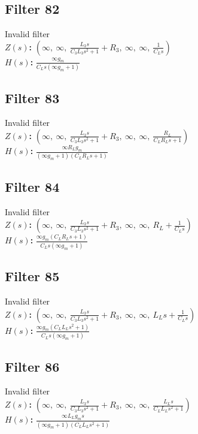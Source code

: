 \documentclass{article}
\begin{document}
\subsection*{Filter 82}
Invalid filter \\ 
\textbf{$Z(s)$:} $\left( \infty, \  \infty, \  \frac{L_{3} s}{C_{3} L_{3} s^{2} + 1} + R_{3}, \  \infty, \  \infty, \  \frac{1}{C_{L} s}\right)$ \\ 
\textbf{$H(s)$:} $\frac{\infty g_{m}}{C_{L} s \left(\infty g_{m} + 1\right)}$ \\ 
\subsection*{Filter 83}
Invalid filter \\ 
\textbf{$Z(s)$:} $\left( \infty, \  \infty, \  \frac{L_{3} s}{C_{3} L_{3} s^{2} + 1} + R_{3}, \  \infty, \  \infty, \  \frac{R_{L}}{C_{L} R_{L} s + 1}\right)$ \\ 
\textbf{$H(s)$:} $\frac{\infty R_{L} g_{m}}{\left(\infty g_{m} + 1\right) \left(C_{L} R_{L} s + 1\right)}$ \\ 
\subsection*{Filter 84}
Invalid filter \\ 
\textbf{$Z(s)$:} $\left( \infty, \  \infty, \  \frac{L_{3} s}{C_{3} L_{3} s^{2} + 1} + R_{3}, \  \infty, \  \infty, \  R_{L} + \frac{1}{C_{L} s}\right)$ \\ 
\textbf{$H(s)$:} $\frac{\infty g_{m} \left(C_{L} R_{L} s + 1\right)}{C_{L} s \left(\infty g_{m} + 1\right)}$ \\ 
\subsection*{Filter 85}
Invalid filter \\ 
\textbf{$Z(s)$:} $\left( \infty, \  \infty, \  \frac{L_{3} s}{C_{3} L_{3} s^{2} + 1} + R_{3}, \  \infty, \  \infty, \  L_{L} s + \frac{1}{C_{L} s}\right)$ \\ 
\textbf{$H(s)$:} $\frac{\infty g_{m} \left(C_{L} L_{L} s^{2} + 1\right)}{C_{L} s \left(\infty g_{m} + 1\right)}$ \\ 
\subsection*{Filter 86}
Invalid filter \\ 
\textbf{$Z(s)$:} $\left( \infty, \  \infty, \  \frac{L_{3} s}{C_{3} L_{3} s^{2} + 1} + R_{3}, \  \infty, \  \infty, \  \frac{L_{L} s}{C_{L} L_{L} s^{2} + 1}\right)$ \\ 
\textbf{$H(s)$:} $\frac{\infty L_{L} g_{m} s}{\left(\infty g_{m} + 1\right) \left(C_{L} L_{L} s^{2} + 1\right)}$ \\ 
\end{document}
